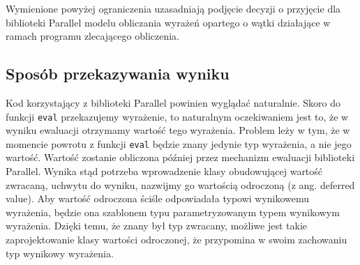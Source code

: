   Wymienione powyżej ograniczenia uzasadniają podjęcie decyzji o przyjęcie dla biblioteki Parallel modelu obliczania wyrażeń opartego o wątki działające w ramach programu zlecającego obliczenia.
  
% 
%   
%   
  
\subsection{Sposób przekazywania wyniku}\label{s:koncepcja_wynik}

  Kod korzystający z biblioteki Parallel powinien wyglądać naturalnie.
  Skoro do funkcji \texttt{eval} przekazujemy wyrażenie, to naturalnym oczekiwaniem jest to, że w wyniku ewaluacji otrzymamy wartość tego wyrażenia.
  Problem leży w tym, że w momencie powrotu z funkcji \texttt{eval} będzie znany jedynie typ wyrażenia, a nie jego wartość.
  Wartość zostanie obliczona później przez mechanizm ewaluacji biblioteki Parallel.
  Wynika stąd potrzeba wprowadzenie klasy obudowującej wartość zwracaną, uchwytu do wyniku, nazwijmy go wartością odroczoną (z ang. deferred value).
  Aby wartość odroczona ściśle odpowiadała typowi wynikowemu wyrażenia, będzie ona szablonem typu parametryzowanym typem wynikowym wyrażenia.
  Dzięki temu, że znany był typ zwracany, możliwe jest takie zaprojektowanie klasy wartości odroczonej, że przypomina w swoim zachowaniu typ wynikowy wyrażenia.
  
